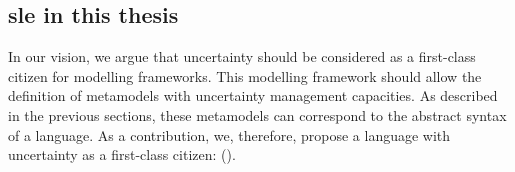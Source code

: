 	
\subsection[SLE in this thesis]{\gls{sle} in this thesis}

In our vision, we argue that uncertainty should be considered as a first-class citizen for modelling frameworks.
This modelling framework should allow the definition of \glspl{metamodel} with uncertainty management capacities.
As described in the previous sections, these \glspl{metamodel} can correspond to the abstract syntax of a language.
As a contribution, we, therefore, propose a language with uncertainty as a first-class citizen: \langName (\cf {}).